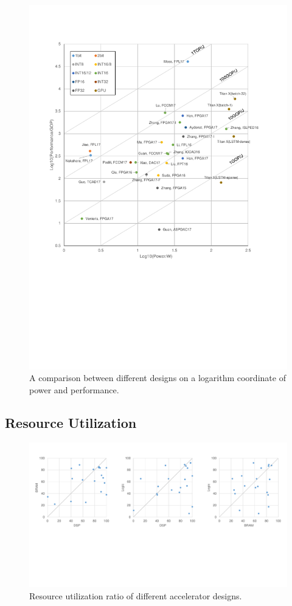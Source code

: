 \begin{figure}[ht]
    \centering
    \includegraphics[width=1.0\columnwidth]{fig/efficiency.pdf}
    \caption{A comparison between different designs on a logarithm coordinate of power and performance. }
    \label{fig:efficiency}
\end{figure}

\subsection{Resource Utilization}

\begin{figure}[ht]
    \centering
    \includegraphics[width=1.0\columnwidth]{fig/resource.pdf}
    \caption{Resource utilization ratio of different accelerator designs.}
    \label{fig:resource}
\end{figure}